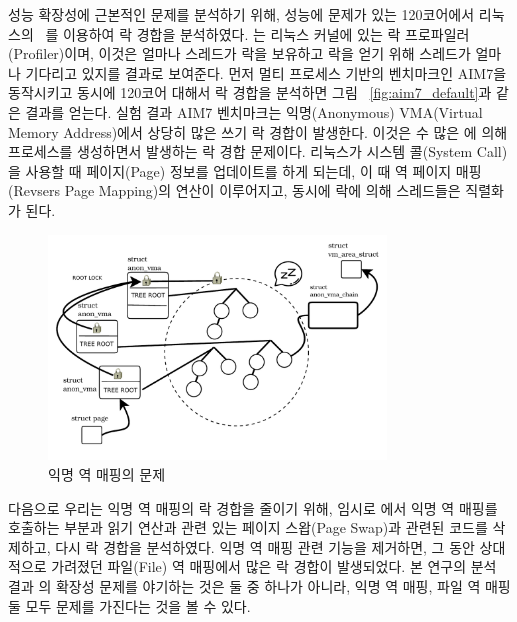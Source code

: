 성능 확장성에 근본적인 문제를 분석하기 위해, 성능에 문제가 있는 120코어에서 리눅스의
~\cite{LOCKSTAT}를 이용하여 락 경합을 분석하였다.
는 리눅스 커널에 있는 락 프로파일러(Profiler)이며, 
이것은 얼마나 스레드가 락을 보유하고 락을 얻기 위해 스레드가 얼마나 기다리고 있지를 결과로 보여준다.
먼저 멀티 프로세스 기반의 벤치마크인 AIM7을 동작시키고 동시에 120코어 대해서 락 경합을 분석하면 
그림 ~\ref{fig:aim7_default}과 같은 결과를 얻는다.
실험 결과 AIM7 벤치마크는 익명(Anonymous) VMA(Virtual Memory Address)에서 상당히 많은 쓰기 락 경합이
발생한다.
이것은 수 많은 에 의해 프로세스를 생성하면서 발생하는 락 경합 문제이다.
리눅스가 시스템 콜(System Call)을 사용할 때 페이지(Page) 정보를
업데이트를 하게 되는데, 이 때 역 페이지 매핑(Revsers Page Mapping)의 연산이 이루어지고, 
동시에 락에 의해 스레드들은 직렬화가 된다. 

 \begin{figure}[h]
    \centering
    \includegraphics[width=0.8\textwidth]{fig/anon_vma_rmap}
    \caption{익명 역 매핑의 문제}
  \label{fig:anon_vma_rmap}
\end{figure}

다음으로 우리는 익명 역 매핑의 락 경합을 줄이기 위해, 임시로 에서 익명 역 매핑를 호출하는 부분과 
읽기 연산과 관련 있는 페이지 스왑(Page Swap)과 관련된 코드를 삭제하고, 다시 락 경합을 분석하였다. 
익명 역 매핑 관련 기능을 제거하면, 그 동안 상대적으로 가려졌던 파일(File) 역 매핑에서 많은 락 경합이 발생되었다.
본 연구의 분석 결과 의 확장성 문제를 야기하는 것은 둘 중 하나가 아니라, 익명 역 매핑, 
파일 역 매핑 둘 모두 문제를 가진다는 것을 볼 수 있다.

